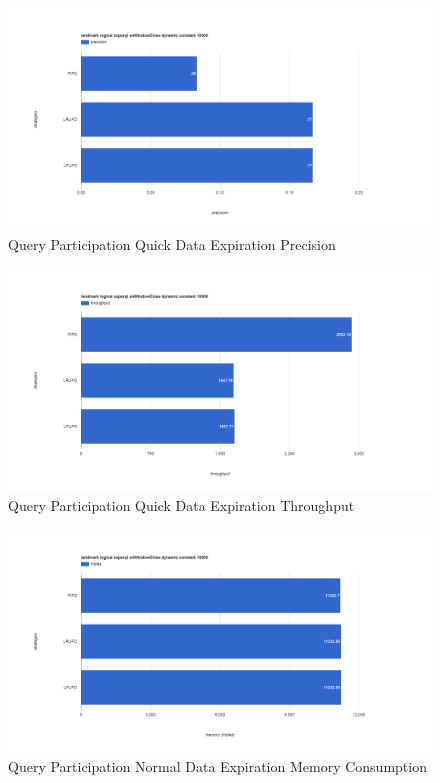 \begin{figure}[!htbp]
    \centering
    \includegraphics[width=\textwidth]{img/app3-qp-quick-p.png}
    \caption{Query Participation Quick Data Expiration Precision}
\end{figure}
\begin{figure}[!htbp]
    \centering
    \includegraphics[width=\textwidth]{img/app3-qp-quick-t.png}
    \caption{Query Participation Quick Data Expiration Throughput}
\end{figure}
\begin{figure}[!htbp]
    \centering
    \includegraphics[width=\textwidth]{img/app3-qp-normal-m.png}
    \caption{Query Participation Normal Data Expiration Memory Consumption}
\end{figure}
